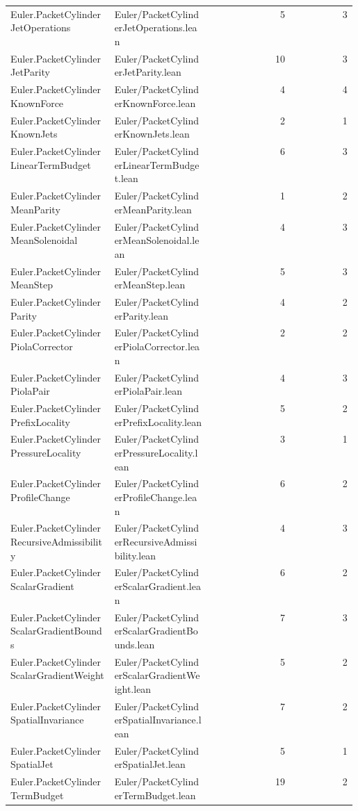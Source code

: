 \begin{longtable}{p{0.30\linewidth}p{0.28\linewidth}rr}
Euler.PacketCylinderJetOperations & Euler/PacketCylinderJetOperations.lean & 5 & 3\\
Euler.PacketCylinderJetParity & Euler/PacketCylinderJetParity.lean & 10 & 3\\
Euler.PacketCylinderKnownForce & Euler/PacketCylinderKnownForce.lean & 4 & 4\\
Euler.PacketCylinderKnownJets & Euler/PacketCylinderKnownJets.lean & 2 & 1\\
Euler.PacketCylinderLinearTermBudget & Euler/PacketCylinderLinearTermBudget.lean & 6 & 3\\
Euler.PacketCylinderMeanParity & Euler/PacketCylinderMeanParity.lean & 1 & 2\\
Euler.PacketCylinderMeanSolenoidal & Euler/PacketCylinderMeanSolenoidal.lean & 4 & 3\\
Euler.PacketCylinderMeanStep & Euler/PacketCylinderMeanStep.lean & 5 & 3\\
Euler.PacketCylinderParity & Euler/PacketCylinderParity.lean & 4 & 2\\
Euler.PacketCylinderPiolaCorrector & Euler/PacketCylinderPiolaCorrector.lean & 2 & 2\\
Euler.PacketCylinderPiolaPair & Euler/PacketCylinderPiolaPair.lean & 4 & 3\\
Euler.PacketCylinderPrefixLocality & Euler/PacketCylinderPrefixLocality.lean & 5 & 2\\
Euler.PacketCylinderPressureLocality & Euler/PacketCylinderPressureLocality.lean & 3 & 1\\
Euler.PacketCylinderProfileChange & Euler/PacketCylinderProfileChange.lean & 6 & 2\\
Euler.PacketCylinderRecursiveAdmissibility & Euler/PacketCylinderRecursiveAdmissibility.lean & 4 & 3\\
Euler.PacketCylinderScalarGradient & Euler/PacketCylinderScalarGradient.lean & 6 & 2\\
Euler.PacketCylinderScalarGradientBounds & Euler/PacketCylinderScalarGradientBounds.lean & 7 & 3\\
Euler.PacketCylinderScalarGradientWeight & Euler/PacketCylinderScalarGradientWeight.lean & 5 & 2\\
Euler.PacketCylinderSpatialInvariance & Euler/PacketCylinderSpatialInvariance.lean & 7 & 2\\
Euler.PacketCylinderSpatialJet & Euler/PacketCylinderSpatialJet.lean & 5 & 1\\
Euler.PacketCylinderTermBudget & Euler/PacketCylinderTermBudget.lean & 19 & 2\\

\end{longtable}

